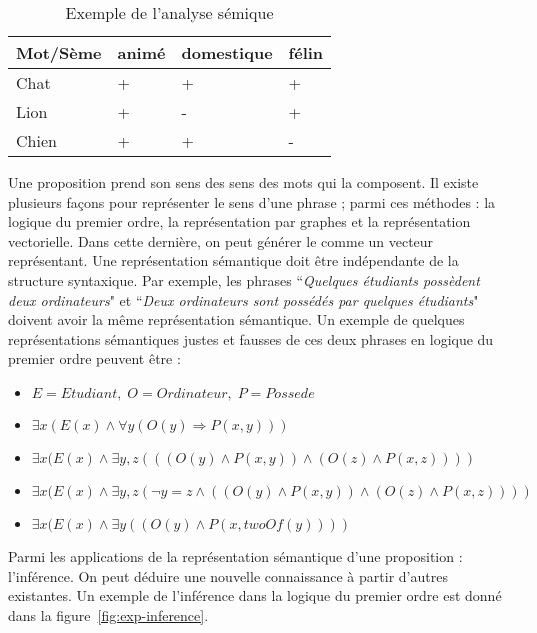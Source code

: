 \documentclass{KodeBook}
\begin{document}
\begin{table}[ht]
	\centering
	\begin{tabular}{|l|l|l|l|}
		\hline
		Mot/Sème & animé & domestique & félin \\
		\hline
		Chat & + & + & + \\
		\hline
		Lion & + & - & + \\
		\hline
		Chien & + & + & - \\
		\hline
	\end{tabular}
	\caption[Exemple de l'analyse sémique]{Exemple de l'analyse sémique \label{tab:semique}}
\end{table}

Une proposition prend son sens des sens des mots qui la composent. 
Il existe plusieurs façons pour représenter le sens d'une phrase ; parmi ces méthodes : la logique du premier ordre, la représentation par graphes et la représentation vectorielle.
Dans cette dernière, on peut générer le  comme un vecteur représentant. 
Une représentation sémantique doit être indépendante de la structure syntaxique.
Par exemple, les phrases ``\textit{Quelques étudiants possèdent deux ordinateurs}" et ``\textit{Deux ordinateurs sont possédés par quelques étudiants}" doivent avoir la même représentation sémantique. 
Un exemple de quelques représentations sémantiques justes et fausses de ces deux phrases en logique du premier ordre peuvent être :
\begin{itemize}
	\item $E = Etudiant, \; O = Ordinateur, \; P = Possede$
	\item $\exists x (E(x) \wedge \forall y ( O(y) \Rightarrow P(x, y)) )$ \textcolor{red}{\XBox}
	\item $\exists x (E(x) \wedge \exists y, z (( (O(y) \wedge P(x, y) ) \wedge (O(z) \wedge P(x, z) ) ))$ \textcolor{red}{\XBox}
	\item $\exists x (E(x) \wedge \exists y, z (\neg y = z \wedge ( (O(y) \wedge P(x, y) ) \wedge (O(z) \wedge P(x, z) ) ))$ \textcolor{olivegreen}{\CheckedBox}
	\item $\exists x (E(x) \wedge \exists y ((O(y) \wedge P(x, twoOf(y)) ))$ \textcolor{olivegreen}{\CheckedBox}
\end{itemize}
Parmi les applications de la représentation sémantique d'une proposition : l'inférence. 
On peut déduire une nouvelle connaissance à partir d'autres existantes. 
Un exemple de l'inférence dans la logique du premier ordre est donné dans la figure~\ref{fig:exp-inference}.
\end{document}
